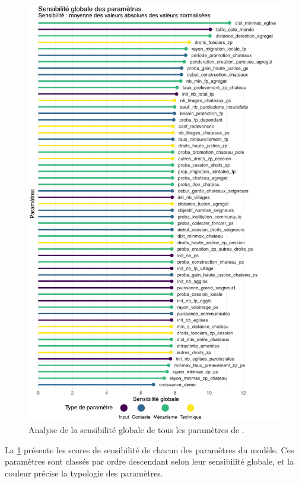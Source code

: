 \begin{figure}[H]
	\centering
	\includegraphics[width=.93\linewidth]{img/sensibilite_globale.pdf}
	\caption{Analyse de la sensibilité globale de tous les paramètres de \simfeodal{}.}
	\label{fig:sensibilite-globale}
\end{figure}

La \cref{fig:sensibilite-globale} présente les \og scores de sensibilité\fg{} de chacun des paramètres du modèle.
Ces paramètres sont classés par ordre descendant selon leur sensibilité globale, et la couleur précise la typologie des paramètres.

